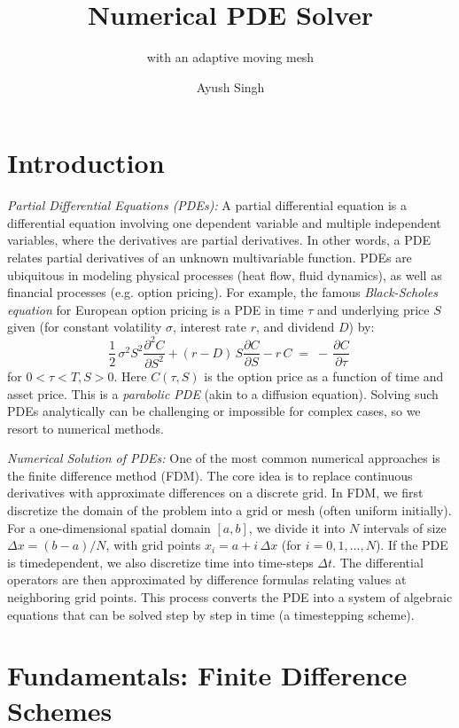 \documentclass{adonis}
\title{Numerical PDE Solver}
\subtitle{with an adaptive moving mesh}
\author{Ayush Singh}
\begin{document}
\maketitle
	
\section{Introduction}

\textit{Partial Differential Equations (PDEs):} A partial differential equation is a differential equation involving one dependent variable and multiple independent variables, where the derivatives are partial derivatives. In other words, a PDE relates partial derivatives of an unknown multivariable function. PDEs are ubiquitous in modeling physical processes (heat flow, fluid dynamics), as well as financial processes (e.g. option pricing). For example, the famous \textit{Black-Scholes equation} for European option pricing is a PDE in time $\tau$ and underlying price $S$ given (for constant volatility $\sigma$, interest rate $r$, and dividend $D$) by:
$$
\frac{1}{2}\,\sigma^2 S^2 \frac{\partial^2 C}{\partial S^2} + (r-D)\,S \frac{\partial C}{\partial S} - r\,C \;=\; -\,\frac{\partial C}{\partial \tau}\
$$
for $0<\tau<T, S>0$. Here $C(\tau,S)$ is the option price as a function of time and asset price. This is a \textit{parabolic PDE} (akin to a diffusion equation). Solving such PDEs analytically can be challenging or impossible for complex cases, so we resort to numerical methods.

\textit{Numerical Solution of PDEs:} One of the most common numerical approaches is the finite difference method (FDM). The core idea is to replace continuous derivatives with approximate differences on a discrete grid. In FDM, we first discretize the domain of the problem into a grid or mesh (often uniform initially). For a one-dimensional spatial domain $[a,b]$, we divide it into $N$ intervals of size $\Delta x = (b-a)/N$, with grid points $x_i = a + i\,\Delta x$ (for $i=0,1,\dots,N$). If the PDE is timedependent, we also discretize time into time-steps $\Delta t$. The differential operators are then approximated by difference formulas relating values at neighboring grid points. This process converts the PDE into a system of algebraic equations that can be solved step by step in time (a timestepping scheme).

\section{Fundamentals: Finite Difference Schemes}
\end{document}
